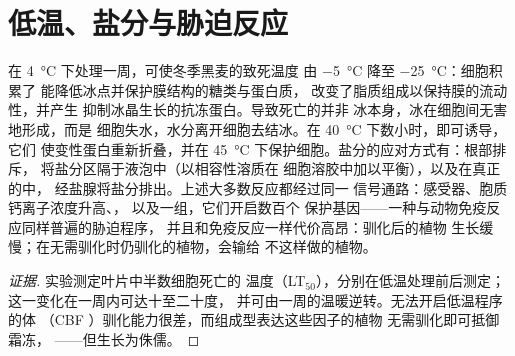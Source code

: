 \section{低温、盐分与胁迫反应}

\begin{proposition}[胁迫驯化]\label{prop:b2:plant-plasticity:stress}
在 \qty{4}{\celsius} 下处理一周，可使冬季黑麦的致死温度
由 \qty{-5}{\celsius} 降至 \qty{-25}{\celsius}：细胞积累了
能降低冰点并保护膜结构的糖类与蛋白质，
改变了脂质组成以保持膜的流动性，并产生
抑制冰晶生长的抗冻蛋白。导致死亡的并非
冰本身，冰在细胞间无害地形成，而是
细胞失水，水分离开细胞去结冰。在
\qty{40}{\celsius} 下数小时，即可诱导\emph{}，它们
使变性蛋白重新折叠，并在
\qty{45}{\celsius} 下保护细胞。盐分的应对方式有：根部排斥，
将盐分区隔于液泡中（以相容性溶质在
细胞溶胶中加以平衡），以及在真正的\emph{}中，
经盐腺将盐分排出。上述大多数反应都经过同一
信号通路：感受器、胞质钙离子浓度升高、，
以及一组，它们开启数百个
保护基因——一种与动物免疫反应同样普遍的胁迫程序，
并且和免疫反应一样代价高昂：驯化后的植物
生长缓慢；在无需驯化时仍驯化的植物，会输给
不这样做的植物。
\end{proposition}
\begin{proof}[证据]
实验测定叶片中半数细胞死亡的
温度（LT$_{50}$），分别在低温处理前后测定；
这一变化在一周内可达十至二十度，
并可由一周的温暖逆转。无法开启低温程序的体
（CBF ）驯化能力很差，而组成型表达这些因子的植物
无需驯化即可抵御霜冻，
——但生长为侏儒。
\end{proof}

